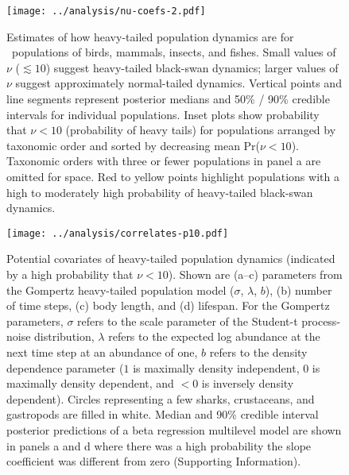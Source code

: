 \clearpage

\begin{figure}[htbp]
\begin{center}
\texttt{[image: ../analysis/nu-coefs-2.pdf]}
\caption{
Estimates of how heavy-tailed population dynamics are for \nuCoefPopN\ populations of birds, mammals, insects, and fishes. Small values of $\nu$ ($\lesssim 10$) suggest heavy-tailed black-swan dynamics; larger values of $\nu$ suggest approximately normal-tailed dynamics. Vertical points and line segments represent posterior medians and 50\% / 90\% credible intervals for individual populations. Inset plots show probability that $\nu < 10$ (probability of heavy tails) for populations arranged by taxonomic order and sorted by decreasing mean Pr($\nu < 10$). Taxonomic orders with three or fewer populations in panel a are omitted for space. Red to yellow points highlight populations with a high to moderately high probability of heavy-tailed black-swan dynamics.
}
\label{fig:nu-coefs}
\end{center}
\end{figure}
\clearpage

\begin{figure}[htbp]
\begin{center}
\texttt{[image: ../analysis/correlates-p10.pdf]}
\caption{
Potential covariates of heavy-tailed population dynamics (indicated by a high probability that $\nu < 10$). Shown are (a--c) parameters from the Gompertz heavy-tailed population model ($\sigma$, $\lambda$, $b$), (b) number of time steps, (c) body length, and (d) lifespan. For the Gompertz parameters, $\sigma$ refers to the scale parameter of the Student-t process-noise distribution, $\lambda$ refers to the expected log abundance at the next time step at an abundance of one, $b$ refers to the density dependence parameter ($1$ is maximally density independent, $0$ is maximally density dependent, and $<0$ is inversely density dependent). Circles representing a few sharks, crustaceans, and gastropods are filled in white. Median and 90\% credible interval posterior predictions of a beta regression multilevel model are shown in panels a and d where there was a high probability the slope coefficient was different from zero (Supporting Information).
}
\label{fig:correlates}
\end{center}
\end{figure}

